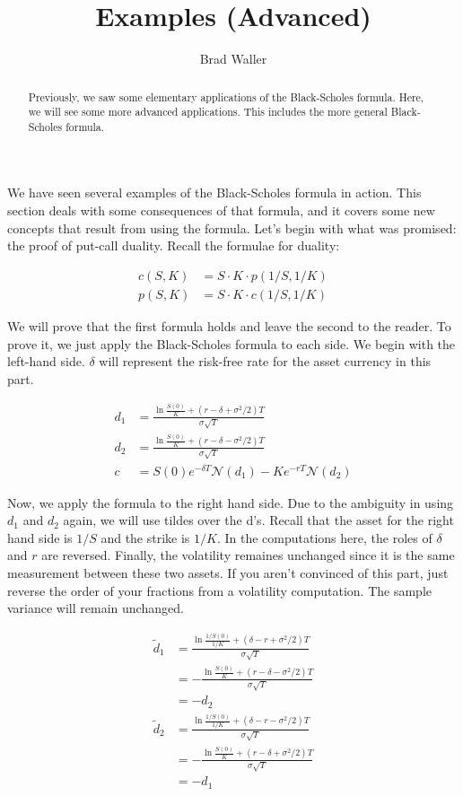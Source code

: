 \documentclass{ximera}
\author{Brad Waller}
\title{Examples (Advanced)}
\begin{document}
\begin{abstract}
Previously, we saw some elementary applications of the Black-Scholes formula. Here, we will see some more advanced applications. This includes the more general Black-Scholes formula.
\end{abstract}

\maketitle

We have seen several examples of the Black-Scholes formula in action. This section deals with some consequences of that formula, and it covers some new concepts that result from using the formula. Let's begin with what was promised: the proof of put-call duality. Recall the formulae for duality:

\begin{align*}
c(S,K) 	&=S\cdot K\cdot p(1/S,1/K)\\
p(S,K)		&=S\cdot K\cdot c(1/S, 1/K)
\end{align*}

We will prove that the first formula holds and leave the second to the reader. To prove it, we just apply the Black-Scholes formula to each side. We begin with the left-hand side. $\delta$ will represent the risk-free rate for the asset currency in this part.

\begin{align*}
d_1 		&=\frac{\ln\frac{S(0)}{K}+(r-\delta+\sigma^2/2)T}{\sigma\sqrt{T}}\\
d_2 		&=\frac{\ln\frac{S(0)}{K}+(r-\delta-\sigma^2/2)T}{\sigma\sqrt{T}}\\
c 		&=S(0)e^{-\delta T}\mathcal{N}(d_1)-Ke^{-rT}\mathcal{N}(d_2)
\end{align*}

Now, we apply the formula to the right hand side. Due to the ambiguity in using $d_1$ and $d_2$ again, we will use tildes over the d's. Recall that the asset for the right hand side is $1/S$ and the strike is $1/K$. In the computations here, the roles of $\delta$ and $r$ are reversed. Finally, the volatility remaines unchanged since it is the same measurement between these two assets. If you aren't convinced of this part, just reverse the order of your fractions from a volatility computation. The sample variance will remain unchanged.

\begin{align*}
\tilde{d}_1 				&=\frac{\ln\frac{1/S(0)}{1/K}+(\delta-r+\sigma^2/2)T}{\sigma\sqrt{T}}\\
					&=-\frac{\ln\frac{S(0)}{K}+(r-\delta-\sigma^2/2)T}{\sigma\sqrt{T}}\\
					&=-d_2\\
\tilde{d}_2 				&=\frac{\ln\frac{1/S(0)}{1/K}+(\delta-r-\sigma^2/2)T}{\sigma\sqrt{T}}\\
					&=-\frac{\ln\frac{S(0)}{K}+(r-\delta+\sigma^2/2)T}{\sigma\sqrt{T}}\\
					&=-d_1
\end{align*}
\end{document}
